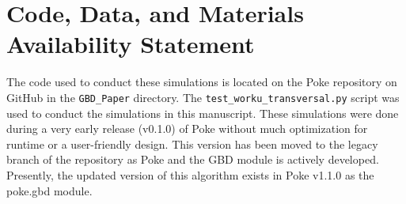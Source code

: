\section{Code, Data, and Materials Availability Statement}

The code used to conduct these simulations is located on the Poke repository on GitHub in the \verb"GBD_Paper" directory. The \verb"test_worku_transversal.py" script was used to conduct the simulations in this manuscript. These simulations were done during a very early release (v0.1.0) of Poke without much optimization for runtime or a user-friendly design. This version has been moved to the legacy branch of the repository as Poke and the GBD module is actively developed. Presently, the updated version of this algorithm exists in Poke v1.1.0 as the poke.gbd module.


